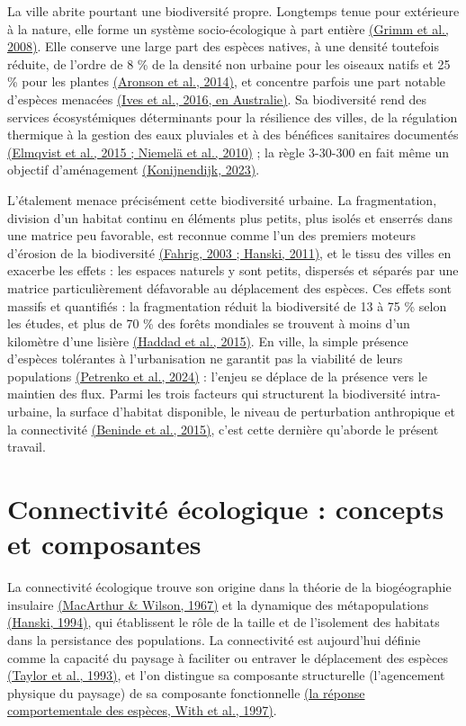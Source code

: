 \documentclass[a4paper,11pt]{report}
\begin{document}
La ville abrite pourtant une biodiversité propre. Longtemps tenue pour extérieure à la nature, elle forme un système socio-écologique à part entière \hyperref[sec:bibliographie]{(Grimm et al., 2008)}. Elle conserve une large part des espèces natives, à une densité toutefois réduite, de l'ordre de 8 \% de la densité non urbaine pour les oiseaux natifs et 25 \% pour les plantes \hyperref[sec:bibliographie]{(Aronson et al., 2014)}, et concentre parfois une part notable d'espèces menacées \hyperref[sec:bibliographie]{(Ives et al., 2016, en Australie)}. Sa biodiversité rend des services écosystémiques déterminants pour la résilience des villes, de la régulation thermique à la gestion des eaux pluviales et à des bénéfices sanitaires documentés \hyperref[sec:bibliographie]{(Elmqvist et al., 2015 ; Niemelä et al., 2010)} ; la règle 3-30-300 en fait même un objectif d'aménagement \hyperref[sec:bibliographie]{(Konijnendijk, 2023)}.

L'étalement menace précisément cette biodiversité urbaine. La fragmentation, division d'un habitat continu en éléments plus petits, plus isolés et enserrés dans une matrice peu favorable, est reconnue comme l'un des premiers moteurs d'érosion de la biodiversité \hyperref[sec:bibliographie]{(Fahrig, 2003 ; Hanski, 2011)}, et le tissu des villes en exacerbe les effets : les espaces naturels y sont petits, dispersés et séparés par une matrice particulièrement défavorable au déplacement des espèces. Ces effets sont massifs et quantifiés : la fragmentation réduit la biodiversité de 13 à 75 \% selon les études, et plus de 70 \% des forêts mondiales se trouvent à moins d'un kilomètre d'une lisière \hyperref[sec:bibliographie]{(Haddad et al., 2015)}. En ville, la simple présence d'espèces tolérantes à l'urbanisation ne garantit pas la viabilité de leurs populations \hyperref[sec:bibliographie]{(Petrenko et al., 2024)} : l'enjeu se déplace de la présence vers le maintien des flux. Parmi les trois facteurs qui structurent la biodiversité intra-urbaine, la surface d'habitat disponible, le niveau de perturbation anthropique et la connectivité \hyperref[sec:bibliographie]{(Beninde et al., 2015)}, c'est cette dernière qu'aborde le présent travail.

\section{Connectivité écologique : concepts et composantes}\label{sec:1.2}

La connectivité écologique trouve son origine dans la théorie de la biogéographie insulaire \hyperref[sec:bibliographie]{(MacArthur \& Wilson, 1967)} et la dynamique des métapopulations \hyperref[sec:bibliographie]{(Hanski, 1994)}, qui établissent le rôle de la taille et de l'isolement des habitats dans la persistance des populations. La connectivité est aujourd'hui définie comme la capacité du paysage à faciliter ou entraver le déplacement des espèces \hyperref[sec:bibliographie]{(Taylor et al., 1993)}, et l'on distingue sa composante structurelle (l'agencement physique du paysage) de sa composante fonctionnelle \hyperref[sec:bibliographie]{(la réponse comportementale des espèces, With et al., 1997)}.
\end{document}
